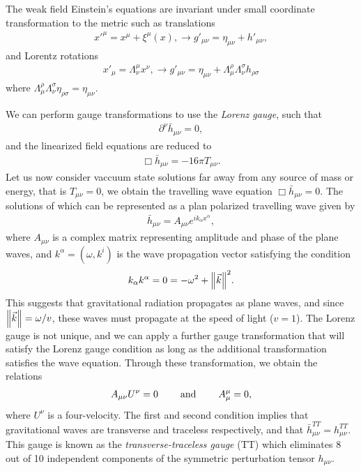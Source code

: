 The weak field Einstein's equations are invariant under small coordinate transformation to the metric such as translations
\begin{align}
    x'^{\mu} = x^{\mu} + \xi^{\mu}(x), \longrightarrow g'_{\mu\nu} = \eta_{\mu\nu} + h'_{\mu\nu},
\end{align}
and Lorentz rotations 
\begin{align}
    x'_{\mu} = \Lambda^{\mu}_{\nu}x^{\nu}, \longrightarrow g'_{\mu\nu} = \eta_{\mu\nu} + \Lambda_{\mu}^{\rho}\Lambda_{\nu}^{\sigma}h_{\rho\sigma}
\end{align}
where $\Lambda_{\mu}^{\rho}\Lambda_{\nu}^{\sigma}\eta_{\rho\sigma} = \eta_{\mu\nu}$. 

We can perform gauge transformations to use the \textit{Lorenz gauge}, such that
\begin{align}
    \partial^{\nu}\bar{h}_{\mu\nu} = 0,
\end{align}
and the linearized field equations are reduced to
\begin{align}
    \Box\bar{h}_{\mu\nu} = -16\pi T_{\mu\nu}.
\end{align}
Let us now consider vaccuum state solutions far away from any source of mass or energy, that is $T_{\mu\nu} = 0$, we obtain the travelling wave equation $\Box \bar{h}_{\mu\nu} = 0$. The solutions of which can be represented as a plan polarized travelling wave given by
\begin{align}
    \bar{h}_{\mu\nu} = A_{\mu\nu}e^{ik_{\alpha}x^{\alpha}},
\end{align}
where $A_{\mu\nu}$ is a complex matrix representing amplitude and phase of the plane waves, and $k^{\alpha} = (\omega, k^i)$ is the wave propagation vector satisfying the condition
\begin{align}
    k_{\alpha}k^{\alpha} = 0 = -\omega^2 + \norm{\vec{k}}^2.
\end{align}
This suggests that gravitational radiation propagates as plane waves, and since $\norm{\vec{k}} = \omega/v$, these waves must propagate at the speed of light ($v=1$). The Lorenz gauge is not unique, and we can apply a further gauge transformation that will satisfy the Lorenz gauge condition as long as the additional transformation satisfies the wave equation. Through these transformation, we obtain the relations
\begin{align}
    A_{\mu\nu}U^{\nu} = 0 \hspace{0.8cm} \text{and} \hspace{0.8cm} A^{\mu}_{ \mu} = 0,
\end{align}
where $U^{\nu}$ is a four-velocity. The first and second condition implies that gravitational waves are transverse and traceless respectively, and that $\bar{h}_{\mu\nu}^{TT} = h_{\mu\nu}^{TT}$. This gauge is known as the \textit{transverse-traceless gauge} (TT) which eliminates 8 out of 10 independent components of the symmetric perturbation tensor $h_{\mu\nu}$.

